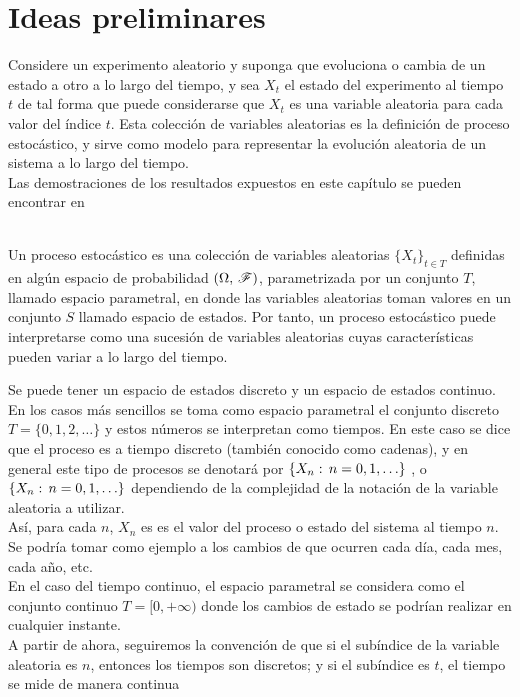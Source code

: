 \section{Ideas preliminares}
Considere un experimento aleatorio y suponga que evoluciona o cambia de un estado a otro a lo largo del tiempo, y sea $X_t$ el estado del experimento al tiempo $t$ de tal forma que puede considerarse
que $X_t$ es una variable aleatoria para cada valor del índice $t$. Esta colección de variables aleatorias es la definición de proceso estocástico, y sirve como modelo para representar la evolución aleatoria de un sistema a lo largo del tiempo.\\
Las demostraciones de los resultados expuestos en este capítulo se pueden encontrar en\\\\
\begin{Def}
    Un proceso estocástico es una colección de variables aleatorias $\{X_t\}_{t\in T}$ definidas en algún espacio de probabilidad $(\Omega,\thinspace\mathscr{F})$, parametrizada por un conjunto $T$, llamado espacio parametral, en donde las variables aleatorias toman valores en un conjunto $S$ llamado espacio de estados.
    Por tanto, un proceso estocástico puede interpretarse como una sucesión de variables aleatorias cuyas características pueden variar a lo largo del tiempo.
\end{Def}
Se puede tener un espacio de estados discreto y un espacio de estados continuo.
En los casos más sencillos se toma como espacio parametral el conjunto
discreto $T= \{0, 1, 2,\ldots\}$ y estos números se interpretan como tiempos. En este caso se dice que el proceso es a tiempo discreto (también conocido como cadenas), y en general este tipo
de procesos se denotará por $\{X_n:\thinspace n= 0, 1, \ldots\}$ , o $\{X_n:\thinspace n= 0, 1, \ldots\}$ dependiendo de la complejidad de la notación de la variable aleatoria a utilizar.\\Así, para cada $n$, $X_n$ es es el valor del proceso o estado del sistema al tiempo $n$.
Se podría tomar como ejemplo a los cambios de que ocurren cada día, cada mes, cada año, etc.\\ En el caso del tiempo continuo, el espacio parametral se considera como el conjunto continuo $T=[0,+\infty)$ donde los cambios de estado se podrían realizar en cualquier instante.\\
A partir de ahora, seguiremos la convención de que si el subíndice de la variable aleatoria es $n$, entonces los tiempos son discretos; y si el subíndice es $t$, el tiempo se mide de manera continua\\
